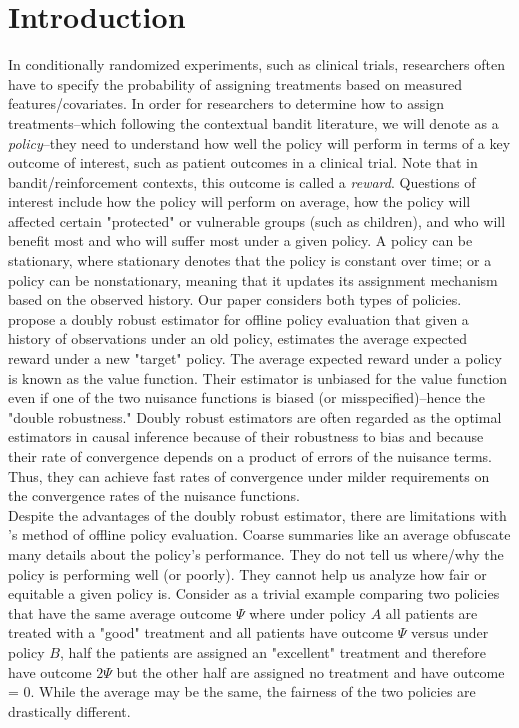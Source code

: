 \section{Introduction}

In conditionally randomized experiments, such as clinical trials, researchers often have to specify the probability of assigning treatments based on measured features/covariates. In order for researchers to determine how to assign treatments--which following the contextual bandit literature, we will denote as a \textit{policy}--they need to understand how well the policy will perform in terms of a key outcome of interest, such as patient outcomes in a clinical trial. Note that in bandit/reinforcement contexts, this outcome is called a \textit{reward}. Questions of interest include how the policy will perform on average, how the policy will affected certain "protected" or vulnerable groups (such as children), and who will benefit most and who will suffer most under a given policy. A policy can be stationary, where stationary denotes that the policy is constant over time; or a policy can be nonstationary, meaning that it updates its assignment mechanism based on the observed history. Our paper considers both types of policies. \\

 \cite{dudik2014doubly} propose a doubly robust estimator for offline policy evaluation that given a history of observations under an old policy, estimates the average expected reward under a new "target" policy. The average expected reward under a policy is known as the value function. Their estimator is unbiased for the value function even if one of the two nuisance functions is biased (or misspecified)--hence the "double robustness." Doubly robust estimators are often regarded as the optimal estimators in causal inference because of their robustness to bias and because their rate of convergence depends on a product of errors of the nuisance terms. Thus, they can achieve fast rates of convergence under milder requirements on the convergence rates of the nuisance functions. \\

Despite the advantages of the doubly robust estimator, there are limitations with \cite{dudik2014doubly}'s method of offline policy evaluation. Coarse summaries like an average obfuscate many details about the policy's performance. They do not tell us where/why the policy is performing well (or poorly). They cannot help us analyze how fair or equitable a given policy is. Consider as a trivial example comparing two policies that have the same average outcome $\Psi$ where under policy $A$ all patients are treated with a "good" treatment and all patients have outcome $\Psi$ versus under policy $B$, half the patients are assigned an "excellent" treatment and therefore have outcome $2\Psi$ but the other half are assigned no treatment and have outcome = 0. While the average may be the same, the fairness of the two policies are drastically different. \\

